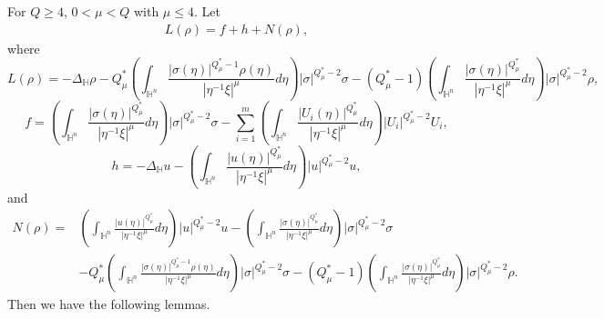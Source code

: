 \documentclass[11pt]{article}
\begin{document}
For $Q\geq 4$, $0<\mu< Q$ with $\mu\leq 4$. Let
\begin{equation}\label{key}
\begin{aligned}
L(\rho)= f+h +  N(\rho),
\end{aligned}
\end{equation}
where
\begin{equation*}
  L(\rho)=-\Delta_{\mathbb{H} } \rho-Q^{\ast}_{\mu}\left(\int_{\mathbb{H}^{n}}\frac{|\sigma(\eta)|^{Q^{\ast}_{\mu}-1}\rho(\eta)}
{|\eta^{-1}\xi|^{\mu}}{d}\eta\right)|\sigma|^{Q^{\ast}_{\mu}-2}\sigma-(Q^{\ast}_{\mu}-1)
\left(\int_{\mathbb{H}^{n}}\frac{|\sigma(\eta)|^{Q^{\ast}_{\mu}}}{|\eta^{-1}\xi|^{\mu}}{d}\eta\right)
|\sigma|^{Q^{\ast}_{\mu}-2}\rho,
\end{equation*}
\begin{equation*}
f=\left(\int_{\mathbb{H}^{n}}\frac{|\sigma(\eta)|^{Q^{\ast}_{\mu}}}
{|\eta^{-1}\xi|^{\mu}}{d}\eta\right)|\sigma|^{Q^{\ast}_{\mu}-2}\sigma-\sum\limits_{i=1}^m
\left(\int_{\mathbb{H}^{n}}\frac{|U_i(\eta)|^{Q^{\ast}_{\mu}}}
{|\eta^{-1}\xi|^{\mu}}{d}\eta\right)|U_i|^{Q^{\ast}_{\mu}-2}U_i,
\end{equation*}
\begin{equation*}
  h=-\Delta_{\mathbb{H} } u-\left(\int_{\mathbb{H}^{n}}\frac{|u(\eta)|^{Q^{\ast}_{\mu}}}
{|\eta^{-1}\xi|^{\mu}}{d}\eta\right)|u|^{Q^{\ast}_{\mu}-2}u,
\end{equation*}
 and
  \begin{align*}
  N(\rho)=&\left(\int_{\mathbb{H}^{n}}\frac{|u(\eta)|^{Q^{\ast}_{\mu}}}
{|\eta^{-1}\xi|^{\mu}}{d}\eta\right)|u|^{Q^{\ast}_{\mu}-2}u-\left(\int_{\mathbb{H}^{n}}\frac{|\sigma(\eta)|^{Q^{\ast}_{\mu}}}
{|\eta^{-1}\xi|^{\mu}}{d}\eta\right)|\sigma|^{Q^{\ast}_{\mu}-2}\sigma\\
&-Q^{\ast}_{\mu}\left(\int_{\mathbb{H}^{n}}\frac{|\sigma(\eta)|^{Q^{\ast}_{\mu}-1}\rho(\eta)}
{|\eta^{-1}\xi|^{\mu}}{d}\eta\right)|\sigma|^{Q^{\ast}_{\mu}-2}\sigma-(Q^{\ast}_{\mu}-1)
\left(\int_{\mathbb{H}^{n}}\frac{|\sigma(\eta)|^{Q^{\ast}_{\mu}}}{|\eta^{-1}\xi|^{\mu}}{d}\eta\right)
|\sigma|^{Q^{\ast}_{\mu}-2}\rho.
  \end{align*}
  Then we have the following lemmas.
\end{document}
